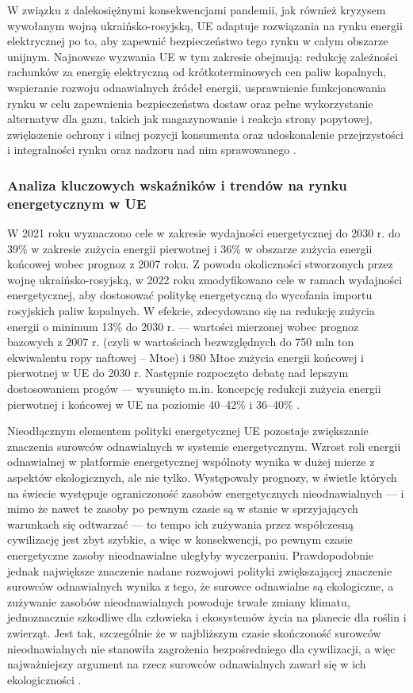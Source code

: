 \documentclass[polish, twoside, 12pt, a4paper]{article}
\theoremstyle{definition}
\theoremstyle{plain}
\theoremstyle{remark}
\begin{document}
W związku z dalekosiężnymi konsekwencjami pandemii, jak również kryzysem wywołanym wojną ukraińsko-rosyjską, UE adaptuje rozwiązania na rynku energii elektrycznej po to, aby zapewnić bezpieczeństwo tego rynku w całym obszarze unijnym. Najnowsze wyzwania UE w tym zakresie obejmują: redukcję zależności rachunków za energię elektryczną od krótkoterminowych cen paliw kopalnych, wspieranie rozwoju odnawialnych źródeł energii, usprawnienie funkcjonowania rynku w celu zapewnienia bezpieczeństwa dostaw oraz pełne wykorzystanie alternatyw dla gazu, takich jak magazynowanie i reakcja strony popytowej, zwiększenie ochrony i silnej pozycji konsumenta oraz udoskonalenie przejrzystości i integralności rynku oraz nadzoru nad nim sprawowanego \citep{ec2023}. 


\subsubsection{Analiza kluczowych wskaźników i trendów na rynku energetycznym w UE}

W 2021 roku wyznaczono cele w zakresie wydajności energetycznej do 2030 r. do 39\% w zakresie zużycia energii pierwotnej i 36\% w obszarze zużycia energii końcowej wobec prognoz z 2007 roku. Z powodu okoliczności stworzonych przez wojnę ukraińsko-rosyjską, w 2022 roku zmodyfikowano cele w ramach wydajności energetycznej, aby dostosować politykę energetyczną do wycofania importu rosyjskich paliw kopalnych. W efekcie, zdecydowano się na redukcję zużycia energii o minimum 13\% do 2030 r. --- wartości mierzonej wobec prognoz bazowych z 2007 r. (czyli w wartościach bezwzględnych do 750 mln ton ekwiwalentu ropy naftowej – Mtoe) i 980 Mtoe zużycia energii końcowej i pierwotnej w UE do 2030 r. Następnie rozpoczęto debatę nad lepszym dostosowaniem progów --- wysunięto m.in. koncepcję redukcji zużycia energii pierwotnej i końcowej w UE na poziomie 40–42\% i 36–40\% \citep{ep2023}.

Nieodłącznym elementem polityki energetycznej UE pozostaje zwiększanie znaczenia surowców odnawialnych w systemie energetycznym. Wzrost roli energii odnawialnej w platformie energetycznej wspólnoty wynika w dużej mierze z aspektów ekologicznych, ale nie tylko. Występowały prognozy, w świetle których na świecie występuje ograniczoność zasobów energetycznych nieodnawialnych --- i mimo że nawet te zasoby po pewnym czasie są w stanie w sprzyjających warunkach się odtwarzać --- to tempo ich zużywania przez współczesną cywilizację jest zbyt szybkie, a więc w konsekwencji, po pewnym czasie energetyczne zasoby nieodnawialne uległyby wyczerpaniu. Prawdopodobnie jednak największe znaczenie nadane rozwojowi polityki zwiększającej znaczenie surowców odnawialnych wynika z tego, że surowce odnawialne są ekologiczne, a zużywanie zasobów nieodnawialnych powoduje trwałe zmiany klimatu, jednoznacznie szkodliwe dla człowieka i ekosystemów życia na planecie dla roślin i zwierząt. Jest tak, szczególnie że w najbliższym czasie skończoność surowców nieodnawialnych nie stanowiła zagrożenia bezpośredniego dla cywilizacji, a więc najważniejszy argument na rzecz surowców odnawialnych zawarł się w ich ekologiczności \citep{ep2023}. 
\end{document}
